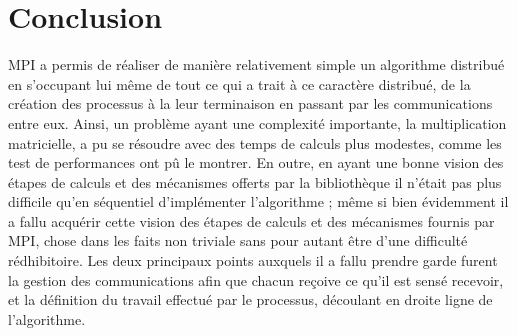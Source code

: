 \documentclass[a4paper,11pt]{article}
\begin{document}
\section{Conclusion}

MPI a permis de réaliser de manière relativement simple un algorithme distribué en s'occupant lui même de tout ce qui a trait à ce caractère distribué, de la création des processus à la leur terminaison en passant par les communications entre eux. Ainsi, un problème ayant une complexité importante, la multiplication matricielle, a pu se résoudre avec des temps de calculs plus modestes, comme les test de performances ont pû le montrer. En outre, en ayant une bonne vision des étapes de calculs et des mécanismes offerts par la bibliothèque il n'était pas plus difficile qu'en séquentiel d'implémenter l'algorithme ; même si bien évidemment il a fallu acquérir cette vision des étapes de calculs et des mécanismes fournis par MPI, chose dans les faits non triviale sans pour autant être d'une difficulté rédhibitoire. Les deux principaux points auxquels il a fallu prendre garde furent la gestion des communications afin que chacun reçoive ce qu'il est sensé recevoir, et la définition du travail effectué par le processus, découlant en droite ligne de l'algorithme.
\end{document}
